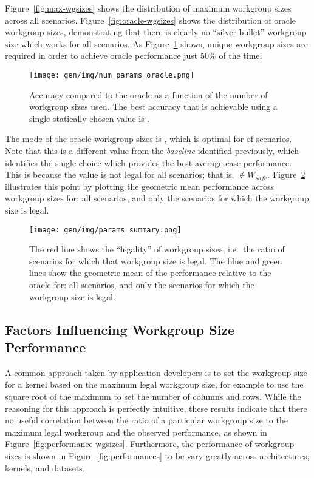Figure~\ref{fig:max-wgsizes} shows the distribution of maximum
workgroup sizes across all scenarios. Figure~\ref{fig:oracle-wgsizes}
shows the distribution of oracle workgroup sizes, demonstrating that
there is clearly no ``silver bullet'' workgroup size which works for
all scenarios. As Figure~\ref{fig:oracle-accuracy} shows,
 unique workgroup sizes are
required in order to achieve oracle performance just 50\% of the
time. 

\begin{figure}
\centering
\texttt{[image: gen/img/num\_params\_oracle.png]}
\caption{%
  Accuracy compared to the oracle as a function of the number of
  workgroup sizes used. The best accuracy that is achievable using a
  single statically chosen value is
  \protect.%
}
\label{fig:oracle-accuracy}
\end{figure}

The mode of the oracle workgroup sizes is
, which is optimal for
 of scenarios. Note that this is
a different value from the \emph{baseline} identified previously,
which identifies the single choice which provides the best average
case performance. This is because the value is not legal for all
scenarios; that is, $ \not\in W_{safe}$.
Figure~\ref{fig:performance-legality} illustrates this point by
plotting the geometric mean performance across workgroup sizes for:
all scenarios, and only the scenarios for which the workgroup size is
legal.

\begin{figure}
\centering
\texttt{[image: gen/img/params\_summary.png]}
\caption{%
  The red line shows the ``legality'' of workgroup sizes, i.e.\ the
  ratio of scenarios for which that workgroup size is legal.  The blue
  and green lines show the geometric mean of the performance relative
  to the oracle for: all scenarios, and only the scenarios for which
  the workgroup size is legal.%
}
\label{fig:performance-legality}
\end{figure}


\subsection{Factors Influencing Workgroup Size Performance}

A common approach taken by application developers is to set the
workgroup size for a kernel based on the maximum legal workgroup size,
for example to use the square root of the maximum to set the number of
columns and rows. While the reasoning for this approach is perfectly
intuitive, these results indicate that there no useful correlation
between the ratio of a particular workgroup size to the maximum legal
workgroup and the observed performance, as shown in
Figure~\ref{fig:performance-wgsizes}. Furthermore, the performance of
workgroup sizes is shown in Figure~\ref{fig:performances} to be vary
greatly across architectures, kernels, and datasets.


